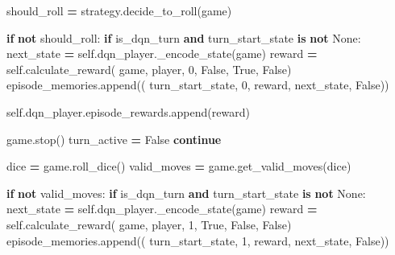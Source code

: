 \documentclass[12pt]{article}
\newenvironment{Shaded}{\begin{snugshade}}{\end{snugshade}}
\newcommand{\ControlFlowTok}[1]{\textcolor[rgb]{0.13,0.29,0.53}{\textbf{#1}}}
\newcommand{\DecValTok}[1]{\textcolor[rgb]{0.00,0.00,0.81}{#1}}
\newcommand{\KeywordTok}[1]{\textcolor[rgb]{0.13,0.29,0.53}{\textbf{#1}}}
\newcommand{\NormalTok}[1]{#1}
\newcommand{\OperatorTok}[1]{\textcolor[rgb]{0.81,0.36,0.00}{\textbf{#1}}}
\newcommand{\VariableTok}[1]{\textcolor[rgb]{0.00,0.00,0.00}{#1}}
\begin{document}
\begin{thesis}
\begin{Shaded}
\begin{Highlighting}[]
\NormalTok{                should\_roll }\OperatorTok{=}\NormalTok{ strategy.decide\_to\_roll(game)}
                
                \ControlFlowTok{if} \KeywordTok{not}\NormalTok{ should\_roll:}
                    \ControlFlowTok{if}\NormalTok{ is\_dqn\_turn }\KeywordTok{and}\NormalTok{ turn\_start\_state }\KeywordTok{is} \KeywordTok{not} \VariableTok{None}\NormalTok{:}
\NormalTok{                        next\_state }\OperatorTok{=} \VariableTok{self}\NormalTok{.dqn\_player.\_encode\_state(game)}
\NormalTok{                        reward }\OperatorTok{=} \VariableTok{self}\NormalTok{.calculate\_reward(}
\NormalTok{                                    game, player, }\DecValTok{0}\NormalTok{, }\VariableTok{False}\NormalTok{, }\VariableTok{True}\NormalTok{, }\VariableTok{False}\NormalTok{)}
\NormalTok{                        episode\_memories.append((}
\NormalTok{                          turn\_start\_state, }\DecValTok{0}\NormalTok{, reward, next\_state, }\VariableTok{False}\NormalTok{))}
                    
                        \VariableTok{self}\NormalTok{.dqn\_player.episode\_rewards.append(reward)}

\NormalTok{                    game.stop()}
\NormalTok{                    turn\_active }\OperatorTok{=} \VariableTok{False}
                    \ControlFlowTok{continue}
                
\NormalTok{                dice }\OperatorTok{=}\NormalTok{ game.roll\_dice()}
\NormalTok{                valid\_moves }\OperatorTok{=}\NormalTok{ game.get\_valid\_moves(dice)}
                
                \ControlFlowTok{if} \KeywordTok{not}\NormalTok{ valid\_moves:}
                    \ControlFlowTok{if}\NormalTok{ is\_dqn\_turn }\KeywordTok{and}\NormalTok{ turn\_start\_state }\KeywordTok{is} \KeywordTok{not} \VariableTok{None}\NormalTok{:}
\NormalTok{                        next\_state }\OperatorTok{=} \VariableTok{self}\NormalTok{.dqn\_player.\_encode\_state(game)}
\NormalTok{                        reward }\OperatorTok{=} \VariableTok{self}\NormalTok{.calculate\_reward(}
\NormalTok{                                        game, player, }\DecValTok{1}\NormalTok{, }\VariableTok{True}\NormalTok{, }\VariableTok{False}\NormalTok{, }\VariableTok{False}\NormalTok{)}
\NormalTok{                        episode\_memories.append((}
\NormalTok{                            turn\_start\_state, }\DecValTok{1}\NormalTok{, reward, next\_state, }\VariableTok{False}\NormalTok{))}
                    

\end{Highlighting}
\end{Shaded}
\end{thesis}
\end{document}
